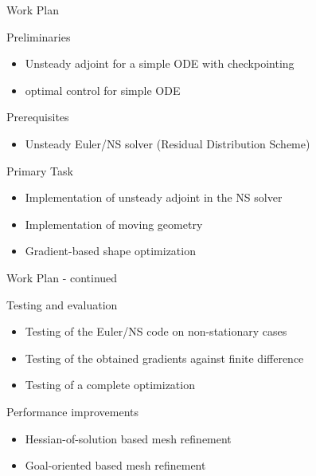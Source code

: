 \begin{frame}{Work Plan}

\begin{block}{Preliminaries}
\begin{itemize}\item Unsteady adjoint for a simple ODE with checkpointing
\item optimal control for simple ODE
\end{itemize}
\end{block}
\pause
\begin{block}{Prerequisites}
\begin{itemize}
\item Unsteady Euler/NS solver (Residual Distribution Scheme)
\end{itemize}
\end{block}
\pause
\begin{block}{Primary Task}
\begin{itemize}
\item Implementation of unsteady adjoint in the NS solver
\item Implementation of moving geometry
\item Gradient-based shape optimization
\end{itemize}
\end{block}

\end{frame}

\begin{frame}{Work Plan - continued}
\begin{block}{Testing and evaluation}
\begin{itemize}
\item Testing of the Euler/NS code on non-stationary cases
\item Testing of the obtained gradients against finite difference
\item Testing of a complete optimization
\end{itemize}
\end{block}
\begin{block}{Performance improvements}
\begin{itemize}
\item Hessian-of-solution based mesh refinement
\item Goal-oriented based mesh refinement
\end{itemize}
\end{block}
\end{frame}


